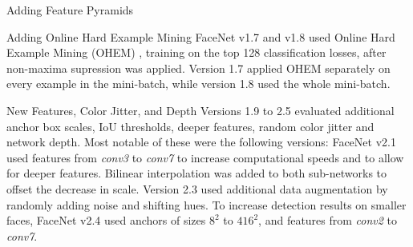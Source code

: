 \documentclass[paperwidth=24in,paperheight=48in, fontscale=0.4166666666666]{baposter}
\begin{document}
\begin{poster}
\begin{posterbox}[name=experiments,column=1, row=0]{Adding Feature Pyramids}
\end{posterbox}



\begin{posterbox}[name=ohem,column=1,below=experiments]{Adding Online Hard Example Mining}
FaceNet v1.7 and v1.8 used Online Hard Example Mining (OHEM) \cite{ohem}, training on the top 128 classification losses, after non-maxima supression was applied. Version 1.7 applied OHEM separately on every example in the mini-batch, while version 1.8 used the whole mini-batch.

\begin{minipage}{0.57\linewidth}
   \centering
   \label{tabseqmnist}
\end{minipage}
\begin{minipage}{0.38\linewidth}
\vspace{10pt}
\end{minipage}
\vspace{-7pt}
\end{posterbox}








\begin{posterbox}[name=imagecaptioning,column=1,below=ohem]{New Features, Color Jitter, and Depth}
Versions 1.9 to 2.5 evaluated additional anchor box scales, IoU thresholds, deeper features, random color jitter and network depth. Most notable of these were the following versions: FaceNet v2.1 used features from \textit{conv3} to \textit{conv7} to increase computational speeds and to allow for deeper features. Bilinear interpolation was added to both sub-networks to offset the decrease in scale. Version 2.3 used additional data augmentation by randomly adding noise and shifting hues. To increase detection results on smaller faces, FaceNet v2.4 used anchors of sizes $8^2$ to $416^2$, and features from \textit{conv2} to \textit{conv7}.



\end{posterbox}
\end{poster}
\end{document}
